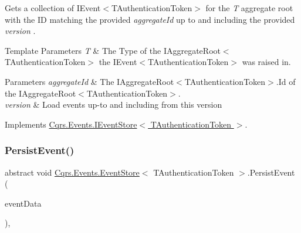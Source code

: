 Gets a collection of I\+Event$<$\+T\+Authentication\+Token$>$ for the {\itshape T} aggregate root with the ID matching the provided {\itshape aggregate\+Id}  up to and including the provided {\itshape version} . 


\begin{DoxyTemplParams}{Template Parameters}
{\em T} & The Type of the I\+Aggregate\+Root$<$\+T\+Authentication\+Token$>$ the I\+Event$<$\+T\+Authentication\+Token$>$ was raised in.\\
\hline
\end{DoxyTemplParams}

\begin{DoxyParams}{Parameters}
{\em aggregate\+Id} & The I\+Aggregate\+Root$<$\+T\+Authentication\+Token$>$.\+Id of the I\+Aggregate\+Root$<$\+T\+Authentication\+Token$>$.\\
\hline
{\em version} & Load events up-\/to and including from this version\\
\hline
\end{DoxyParams}


Implements \hyperlink{interfaceCqrs_1_1Events_1_1IEventStore_af29401f4562cb504cf827b90b8391765_af29401f4562cb504cf827b90b8391765}{Cqrs.\+Events.\+I\+Event\+Store$<$ T\+Authentication\+Token $>$}.

\mbox{\label{classCqrs_1_1Events_1_1EventStore_aedb71ca0ddf21220e323bc60ad7508cd_aedb71ca0ddf21220e323bc60ad7508cd}} 
\subsubsection{\texorpdfstring{Persist\+Event()}{PersistEvent()}}
{\footnotesize\ttfamily abstract void \hyperlink{classCqrs_1_1Events_1_1EventStore}{Cqrs.\+Events.\+Event\+Store}$<$ T\+Authentication\+Token $>$.Persist\+Event (\begin{DoxyParamCaption}\item[{\hyperlink{classCqrs_1_1Events_1_1EventData}{Event\+Data}}]{event\+Data }\end{DoxyParamCaption})\hspace{0.3cm}{\ttfamily [protected]}, {}}



